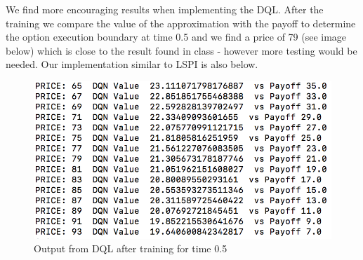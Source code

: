 \documentclass{article}[12pt]
\begin{document}
We find more encouraging results when implementing the DQL. After the training we compare the value of the approximation with the payoff to determine the option execution boundary at time 0.5 and we find a price of 79 (see image below) which is close to the result found in class - however more testing would be needed. Our implementation similar to LSPI is also below.

\begin{figure}[h]
  \includegraphics[width=\linewidth]{output_dql.png}
  \caption{Output from DQL after training for time 0.5}
  \label{fig:optPol1}
\end{figure}
\end{document}
